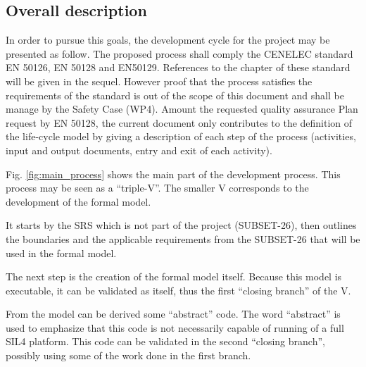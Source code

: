 \subsection{Overall description}




In order to pursue this goals, the development cycle for the project may be presented as follow. 
The proposed process shall comply the CENELEC standard EN 50126, EN 50128  and EN50129. References to the chapter of these standard will be given in the sequel.
However proof that the process satisfies the requirements of the standard is out of the scope of this document and shall be manage by the Safety Case (WP4).
Amount the requested quality assurance Plan request by  EN 50128, the current document only contributes to the definition of the life-cycle model by giving a description of each step of the process (activities, input and output documents, entry and exit of each activity).


Fig. \ref{fig:main_process} shows the main part of the development process. This process may be seen
as a ``triple-V''. The smaller V corresponds to the development of the formal model. 

It starts by the SRS which is not part of the project (SUBSET-26), then outlines the boundaries and 
the applicable requirements from the SUBSET-26 that will be used in the formal model. 

The next step is the creation of the formal model itself. Because this model is executable, it can 
be validated as itself, thus the first ``closing branch'' of the V.


From the model can be derived some ``abstract'' code. The word ``abstract'' is used to emphasize that 
this code is not necessarily capable of running of a full SIL4 platform. This code can be validated 
in the second ``closing branch'', possibly using some of the work done in the first branch. 

